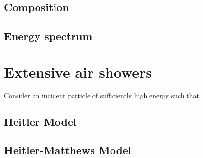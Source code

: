 \subsection{Composition}
\label{ssec:cr-composition}

\subsection{Energy spectrum}
\label{ssec:cr-energy-spectrum}


\section{Extensive air showers}
\label{sec:extensive-air-showers}

Consider an incident particle of sufficiently high energy such that 

\subsection{Heitler Model}
\label{ssec:heitler-model}

\subsection{Heitler-Matthews Model}
\label{ssec:heitler-matthews-model}








